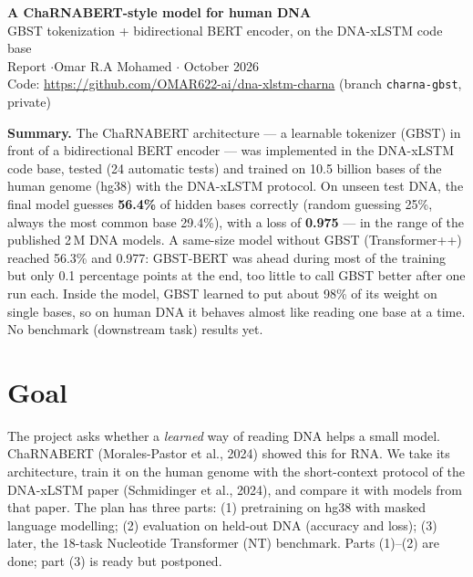 \documentclass[11pt,a4paper]{article}
\newcommand{\code}[1]{\texttt{\small #1}}
\begin{document}
\sloppy

\begin{center}
{\LARGE\bfseries\color{accent} A ChaRNABERT-style model for human DNA}\\[6pt]
{\large GBST tokenization + bidirectional BERT encoder, on the DNA-xLSTM code base}\\[10pt]
Report \quad$\cdot$\quad Omar R.A Mohamed \quad$\cdot$ October 2026\\[4pt]
Code: \url{https://github.com/OMAR622-ai/dna-xlstm-charna} (branch \code{charna-gbst}, private)
\end{center}

\vspace{4pt}
\noindent\colorbox{soft}{\parbox{\dimexpr\linewidth-2\fboxsep}{
\textbf{Summary.} The ChaRNABERT architecture --- a learnable tokenizer (GBST) in front of a
bidirectional BERT encoder --- was implemented in the DNA-xLSTM code base, tested (24 automatic
tests) and trained on 10.5 billion bases of the human genome (hg38) with the DNA-xLSTM protocol.
On unseen test DNA, the final model guesses \textbf{56.4\%} of hidden bases correctly (random
guessing 25\%, always the most common base 29.4\%), with a loss of \textbf{0.975} --- in the range
of the published 2\,M DNA models. A same-size model without GBST (Transformer++) reached 56.3\% and
0.977: GBST-BERT was ahead during most of the training but only 0.1 percentage points at the end,
too little to call GBST better after one run each. Inside the model, GBST learned to put about
98\% of its weight on single bases, so on human DNA it behaves almost like reading one base at a
time. No benchmark (downstream task) results yet.
}}

\tableofcontents
\vspace{6pt}

\section{Goal}

The project asks whether a \emph{learned} way of reading DNA helps a small model. ChaRNABERT
(Morales-Pastor et al., 2024) showed this for RNA. We take its architecture, train it on the human
genome with the short-context protocol of the DNA-xLSTM paper (Schmidinger et al., 2024), and
compare it with models from that paper. The plan has three parts: (1) pretraining on hg38 with
masked language modelling; (2) evaluation on held-out DNA (accuracy and loss); (3) later, the
18-task Nucleotide Transformer (NT) benchmark. Parts (1)--(2) are done; part (3) is ready but
postponed.
\end{document}
